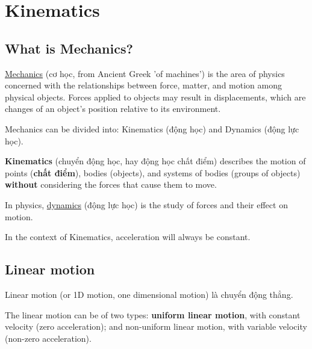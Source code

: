 \chapter{Kinematics}

\section{What is Mechanics?}

\href{https://en.wikipedia.org/wiki/Mechanics}{Mechanics} (cơ học, from Ancient Greek 'of machines') is the area of physics concerned with the relationships between force, matter, and motion among physical objects. Forces applied to objects may result in displacements, which are changes of an object's position relative to its environment.

Mechanics can be divided into: Kinematics (động học) and Dynamics (động lực học).

\textbf{Kinematics} (chuyển động học, hay động học chất điểm) describes the motion of points (\textbf{chất điểm}), bodies (objects), and systems of bodies (groups of objects) \textbf{without} considering the forces that cause them to move.

In physics, \href{https://en.wikipedia.org/wiki/Dynamics_(mechanics)}{dynamics} (động lực học) is the study of forces and their effect on motion.

In the context of Kinematics, acceleration will always be constant.

\section{Linear motion}

Linear motion (or 1D motion, one dimensional motion) là chuyển động thẳng.

The linear motion can be of two types: \textbf{uniform linear motion}, with constant velocity (zero acceleration); and non-uniform linear motion, with variable velocity (non-zero acceleration).